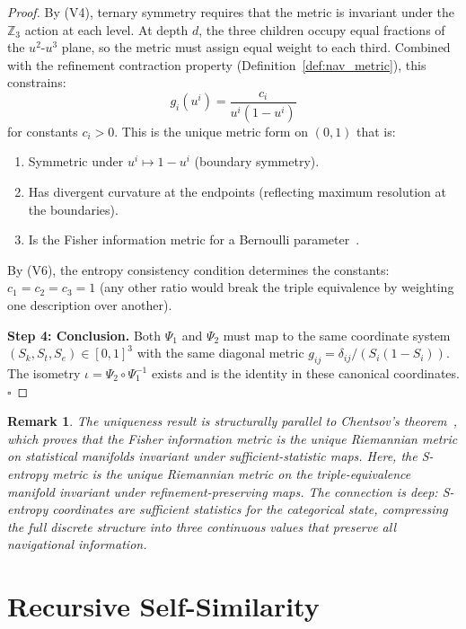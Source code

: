\documentclass[12pt,twocolumn]{article}
\newtheorem{remark}{Remark}[section]
\begin{document}
\begin{proof}
By (V4), ternary symmetry requires that the metric is invariant under the $\mathbb{Z}_3$ action at each level. At depth $d$, the three children occupy equal fractions of the $u^2$-$u^3$ plane, so the metric must assign equal weight to each third. Combined with the refinement contraction property (Definition~\ref{def:nav_metric}), this constrains:
\begin{equation}
g_i(u^i) = \frac{c_i}{u^i(1 - u^i)}
\end{equation}
for constants $c_i > 0$. This is the unique metric form on $(0,1)$ that is:
\begin{enumerate}
\item Symmetric under $u^i \mapsto 1 - u^i$ (boundary symmetry).
\item Has divergent curvature at the endpoints (reflecting maximum resolution at the boundaries).
\item Is the Fisher information metric for a Bernoulli parameter~\cite{amari1985differential,chentsov1972statistical}.
\end{enumerate}

By (V6), the entropy consistency condition determines the constants: $c_1 = c_2 = c_3 = 1$ (any other ratio would break the triple equivalence by weighting one description over another).

\textbf{Step 4: Conclusion.} Both $\Psi_1$ and $\Psi_2$ must map to the same coordinate system $(S_k, S_t, S_e) \in [0,1]^3$ with the same diagonal metric $g_{ij} = \delta_{ij}/(S_i(1-S_i))$. The isometry $\iota = \Psi_2 \circ \Psi_1^{-1}$ exists and is the identity in these canonical coordinates. $\square$
\end{proof}

\begin{remark}
The uniqueness result is structurally parallel to Chentsov's theorem~\cite{chentsov1972statistical}, which proves that the Fisher information metric is the unique Riemannian metric on statistical manifolds invariant under sufficient-statistic maps. Here, the S-entropy metric is the unique Riemannian metric on the triple-equivalence manifold invariant under refinement-preserving maps. The connection is deep: S-entropy coordinates \emph{are} sufficient statistics for the categorical state, compressing the full discrete structure into three continuous values that preserve all navigational information.
\end{remark}


\section{Recursive Self-Similarity}
\label{sec:self_similarity}
\end{document}
